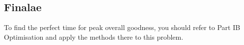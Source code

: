 
\startEntry{}
\subsection{Finalae}
To find the perfect time for peak overall goodness, you should refer to Part IB Optimisation and apply the methods there to this problem.
\finishEntry{}